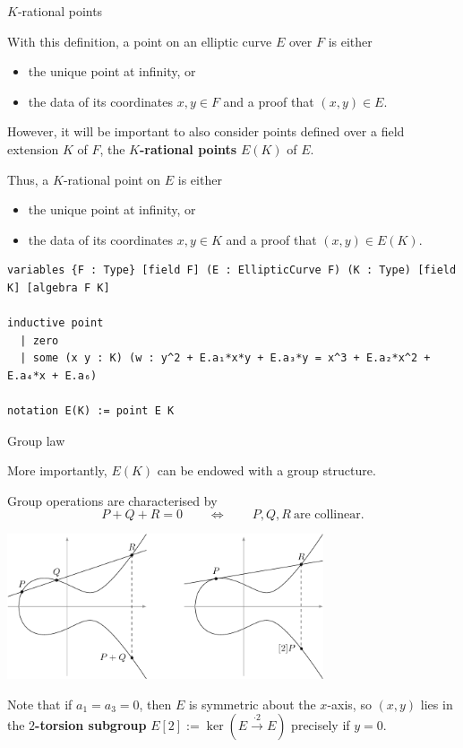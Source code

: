\documentclass[10pt]{beamer}
\begin{document}
\begin{frame}[fragile, t]{$ K $-rational points}

With this definition, a point on an elliptic curve $ E $ over $ F $ is either
\begin{itemize}
\item the unique point at infinity, or
\item the data of its coordinates $ x, y \in F $ and a proof that $ (x, y) \in E $.
\end{itemize}
However, it will be important to also consider points defined over a field extension $ K $ of $ F $, the \textbf{$ K $-rational points} $ E(K) $ of $ E $.

\vspace{0.5cm}

Thus, a $ K $-rational point on $ E $ is either
\begin{itemize}
\item the unique point at infinity, or
\item the data of its coordinates $ x, y \in K $ and a proof that $ (x, y) \in E(K) $.
\end{itemize}

\begin{lstlisting}[basicstyle=\scriptsize, frame=single]
variables {F : Type} [field F] (E : EllipticCurve F) (K : Type) [field K] [algebra F K]

inductive point
  | zero
  | some (x y : K) (w : y^2 + E.a₁*x*y + E.a₃*y = x^3 + E.a₂*x^2 + E.a₄*x + E.a₆)

notation E(K) := point E K
\end{lstlisting}

\end{frame}

\begin{frame}[t]{Group law}

More importantly, $ E(K) $ can be endowed with a group structure.

\vspace{0.5cm}

Group operations are characterised by $$ P + Q + R = 0 \qquad \iff \qquad P, Q, R \ \text{are collinear}. $$

\begin{center}
\includegraphics[width=0.7\textwidth]{grouplaw.png}
\end{center}

Note that if $ a_1 = a_3 = 0 $, then $ E $ is symmetric about the $ x $-axis, so $ (x, y) $ lies in the \textbf{$ 2 $-torsion subgroup} $ E[2] := \ker (E \xrightarrow{\cdot 2} E) $ precisely if $ y = 0 $.

\end{frame}
\end{document}
